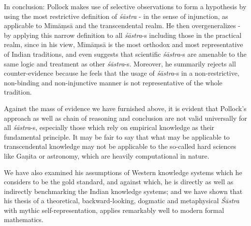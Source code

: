 In conclusion: Pollock makes use of selective observations to form a hypothesis by using the most restrictive definition of {\sl śāstra} - in the sense of injunction, as applicable to Mīmāṃsā and the transcendental realm. He then overgeneralizes - by applying this narrow definition to all {\sl śāstra}-s including those in the practical realm, since in his view, Mīmāṃsā is the most orthodox and most representative of Indian traditions, and even suggests that scientific {\sl śāstra}-s are amenable to the same logic and treatment as other {\sl śāstra}-s. Moreover, he summarily rejects all counter-evidence because he feels that the usage of {\sl śāstra}-s in a non-restrictive, non-binding and non-injunctive manner is not representative of the whole tradition. 

Against the mass of evidence we have furnished above, it is evident that Pollock’s approach as well as chain of reasoning and conclusion are not valid universally for all {\sl śāstra}-s, especially those which rely on empirical knowledge as their fundamental principle. It may be fair to say that what may be applicable to transcendental knowledge may not be applicable to the so-called hard sciences like Gaṇita or astronomy, which are heavily computational in nature.

We have also examined his assumptions of Western knowledge systems which he considers to be the gold standard, and against which, he is directly as well as indirectly benchmarking the Indian knowledge systems; and we have shown that his thesis of a theoretical, backward-looking, dogmatic and metaphysical {\sl Śāstra} with mythic self-representation, applies remarkably well to modern formal mathematics.

